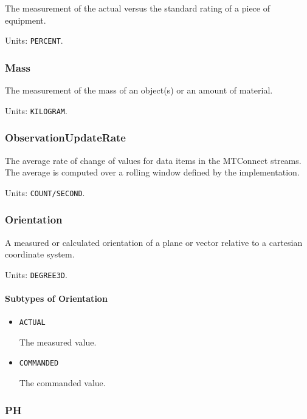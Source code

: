 The measurement of the actual versus the standard rating of a piece of equipment.


Units: \texttt{PERCENT}.

\subsubsection{Mass}
\label{sec:Mass}



The measurement of the mass of an object(s) or an amount of material.


Units: \texttt{KILOGRAM}.

\subsubsection{ObservationUpdateRate}
\label{sec:ObservationUpdateRate}



The average rate of change of values for data items in the MTConnect streams. The average is computed over a rolling window defined by the implementation.


Units: \texttt{COUNT/SECOND}.

\subsubsection{Orientation}
\label{sec:Orientation}



A measured or calculated orientation of a plane or vector relative to a cartesian coordinate system.


Units: \texttt{DEGREE\textunderscore 3D}.

\paragraph{Subtypes of Orientation}\mbox{}
\label{sec:Subtypes of Orientation}

\begin{itemize}

\item \texttt{ACTUAL}


The measured value.

\item \texttt{COMMANDED}


The commanded value.


\end{itemize}

\subsubsection{PH}
\label{sec:PH}



